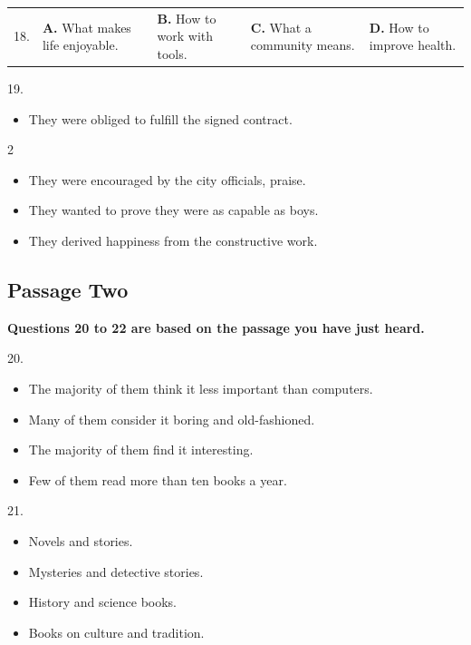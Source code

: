 \documentclass[UTF8,11pt]{ctexart}
\begin{document}
\noindent\begin{tabularx}{\linewidth}{@{}lXXXX@{}}18. & \textbf{A.} What makes life enjoyable. & \textbf{B.} How to work with tools. & \textbf{C.} What a community means. & \textbf{D.} How to improve health.\\\end{tabularx}\par

19.


\begin{itemize}[leftmargin=2em,itemsep=.2em,topsep=.4em]\item[A.] They were obliged to fulfill the signed contract.
\end{itemize}

2


\begin{itemize}[leftmargin=2em,itemsep=.2em,topsep=.4em]\item[B.] They were encouraged by the city officials, praise.
\item[C.] They wanted to prove they were as capable as boys.
\item[D.] They derived happiness from the constructive work.
\end{itemize}

\subsection*{\textbf{Passage Two}}


\textbf{Questions 20 to 22 are based on the passage you have just heard.}


20.


\begin{itemize}[leftmargin=2em,itemsep=.2em,topsep=.4em]\item[A.] The majority of them think it less important than computers.
\item[B.] Many of them consider it boring and old-fashioned.
\item[C.] The majority of them find it interesting.
\item[D.] Few of them read more than ten books a year.
\end{itemize}

21.


\begin{itemize}[leftmargin=2em,itemsep=.2em,topsep=.4em]\item[A.] Novels and stories.
\item[B.] Mysteries and detective stories.
\item[C.] History and science books.
\item[D.] Books on culture and tradition.
\end{itemize}
\end{document}

